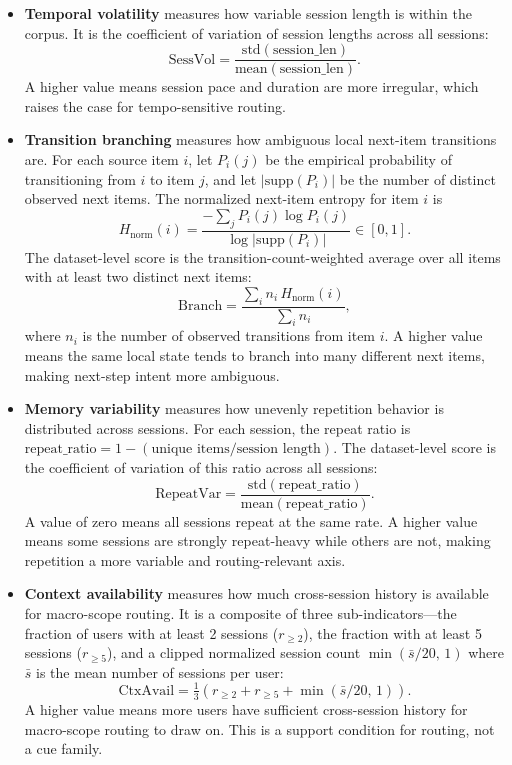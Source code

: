 \begin{itemize}
  \item \textbf{Temporal volatility} measures how variable session length is within the corpus. It is the coefficient of variation of session lengths across all sessions:
  \[
    \text{SessVol} = \frac{\mathrm{std}(\text{session\_len})}{\mathrm{mean}(\text{session\_len})}.
  \]
  A higher value means session pace and duration are more irregular, which raises the case for tempo-sensitive routing.

  \item \textbf{Transition branching} measures how ambiguous local next-item transitions are. For each source item $i$, let $P_i(j)$ be the empirical probability of transitioning from $i$ to item $j$, and let $|\mathrm{supp}(P_i)|$ be the number of distinct observed next items. The normalized next-item entropy for item $i$ is
  \[
    H_{\mathrm{norm}}(i) = \frac{-\sum_j P_i(j)\log P_i(j)}{\log|\mathrm{supp}(P_i)|} \in [0, 1].
  \]
  The dataset-level score is the transition-count-weighted average over all items with at least two distinct next items:
  \[
    \text{Branch} = \frac{\sum_i n_i \, H_{\mathrm{norm}}(i)}{\sum_i n_i},
  \]
  where $n_i$ is the number of observed transitions from item $i$. A higher value means the same local state tends to branch into many different next items, making next-step intent more ambiguous.

  \item \textbf{Memory variability} measures how unevenly repetition behavior is distributed across sessions. For each session, the repeat ratio is $\text{repeat\_ratio} = 1 - (\text{unique items} / \text{session length})$. The dataset-level score is the coefficient of variation of this ratio across all sessions:
  \[
    \text{RepeatVar} = \frac{\mathrm{std}(\text{repeat\_ratio})}{\mathrm{mean}(\text{repeat\_ratio})}.
  \]
  A value of zero means all sessions repeat at the same rate. A higher value means some sessions are strongly repeat-heavy while others are not, making repetition a more variable and routing-relevant axis.

  \item \textbf{Context availability} measures how much cross-session history is available for macro-scope routing. It is a composite of three sub-indicators---the fraction of users with at least 2 sessions ($r_{\ge 2}$), the fraction with at least 5 sessions ($r_{\ge 5}$), and a clipped normalized session count $\min(\bar{s}/20,\,1)$ where $\bar{s}$ is the mean number of sessions per user:
  \[
    \text{CtxAvail} = \tfrac{1}{3}\!\left(r_{\ge 2} + r_{\ge 5} + \min\!\left(\bar{s}/20,\,1\right)\right).
  \]
  A higher value means more users have sufficient cross-session history for macro-scope routing to draw on. This is a support condition for routing, not a cue family.
\end{itemize}

